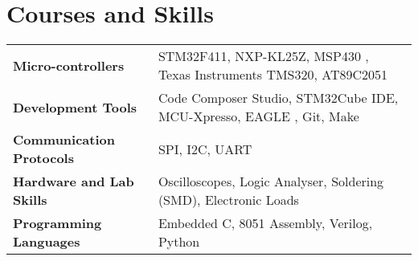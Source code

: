 \documentclass[letterpaper,11pt]{article}
\newcommand{\resumeSubHeadingListStart}{\begin{itemize}[leftmargin=0.0in, label={}]}
\newcommand{\resumeSubHeadingListEnd}{\end{itemize}}
\begin{document}
 \section{Courses and Skills}
 \vspace{-4mm}
\begin{table}[!htb]
    \begin{tabular}{ m{5.3cm} | m{14cm} } 
     \textbf{Micro-controllers}&{\: STM32F411, NXP-KL25Z, MSP430 , Texas Instruments TMS320, AT89C2051} \\
     \textbf{Development Tools}&{\: Code Composer Studio, STM32Cube IDE, MCU-Xpresso, EAGLE , Git, Make} \\
     \textbf{Communication Protocols  }&{\: SPI, I2C, UART} \\
     \textbf{Hardware and Lab Skills}&{\: Oscilloscopes, Logic Analyser, Soldering (SMD), Electronic Loads} \\
     \textbf{Programming Languages}&{\: Embedded C, 8051 Assembly, Verilog, Python}
    \end{tabular}
\end{table}
 \vspace{-8pt}


\end{document}
